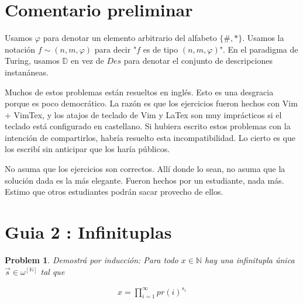 \documentclass[a4paper, 12pt]{article}
\newtheorem{problem}{Problem}
\newtheorem{problem}{Problem}
\begin{document}
\section{Comentario preliminar}

Usamos $\varphi$ para denotar un elemento arbitrario del alfabeto $\{\#, *\}$. Usamos la notación $f \sim (n, m, \varphi)$ para decir "$f$ es de
tipo $(n, m, \varphi)$". En el paradigma de Turing, usamos $\mathbb{D}$ en vez
de $Des$ para denotar el conjunto de
descripciones instanáneas.

Muchos de estos problemas están resueltos en inglés. Esto es una desgracia
porque es poco democrático. La razón es que los ejercicios fueron hechos con Vim
+ VimTex, y los atajos de teclado de Vim y LaTex son muy imprácticos si el
teclado está configurado en castellano. Si hubiera escrito estos problemas con
la intención de compartirlos, habría resuelto esta incompatibilidad. Lo cierto
es que los escribí sin anticipar que los haría públicos. 

No asuma que los ejercicios son correctos. Allí donde lo sean, no asuma que la
solución dada es la más elegante. Fueron hechos por un estudiante, nada más.
Estimo que otros estudiantes podrán sacar provecho de ellos.

\section{Guia 2 : Infinituplas}


\begin{problem}
    Demostrá por inducción: 
    Para todo $x \in \mathbb{N}$ hay una infinitupla única $\overrightarrow{s}
    \in \omega^{[\mathbb{N}]}$ tal que

    \begin{align*}
        x = \prod_{i=1}^{\infty} pr(i)^{s_i}
    \end{align*}
\end{problem}
\end{document}

